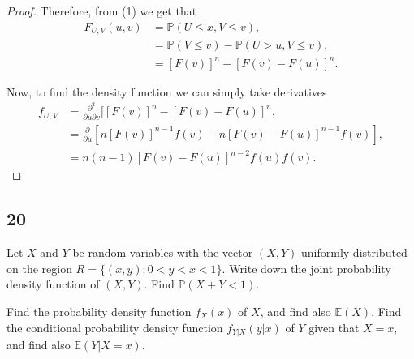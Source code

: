\documentclass{article}
\newcommand{\partiald}[2]{\frac{\partial #1}{\partial #2}}
\renewcommand{\P}[1]{\mathbb{P}(#1)}
\newcommand{\E}[1]{\mathbb{E}(#1)}
\begin{document}
\begin{proof}
    Therefore, from (1) we get that
    \begin{align*}
        F_{U,V}(u,v) & = \P{U \leq x, V \leq v},             \\
                     & = \P{V \leq v} - \P{U > u, V \leq v}, \\
                     & = [F(v)]^n - [F(v) - F(u)]^n.
    \end{align*}

    Now, to find the density function we can simply take derivatives
    \begin{align*}
        f_{U,V} & = \frac{\partial^2}{\partial u \partial v}[[F(v)]^n - [F(v) - F(u)]^n, \\
                & = \partiald{}{u}[n[F(v)]^{n-1}f(v) - n[F(v)-F(u)]^{n-1}f(v)],          \\
                & = n(n-1)[F(v)-F(u)]^{n-2}f(u)f(v).
    \end{align*}
\end{proof}

\subsection*{20}
Let $X$ and $Y$ be random variables with the vector $(X,Y)$ uniformly
distributed on the region $R= \{(x,y): 0<y<x<1\}$. Write down the joint
probability density function of $(X,Y)$. Find $\P{X+Y < 1}$.

Find the probability density function $f_X(x)$ of $X$, and find also
$\E{X}$. Find the conditional probability density function
$f_{Y|X}(y|x)$ of $Y$ given that $X=x$, and find also
$\E{Y|X = x}$.
\end{document}
